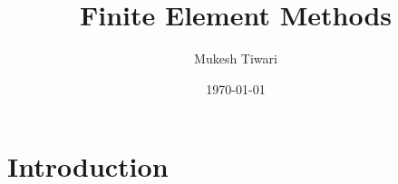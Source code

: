 \documentclass{article}
\title{Finite Element Methods}
\author{Mukesh Tiwari}
\date{\today}
\begin{document}
\maketitle

\section{Introduction}
\end{document}
